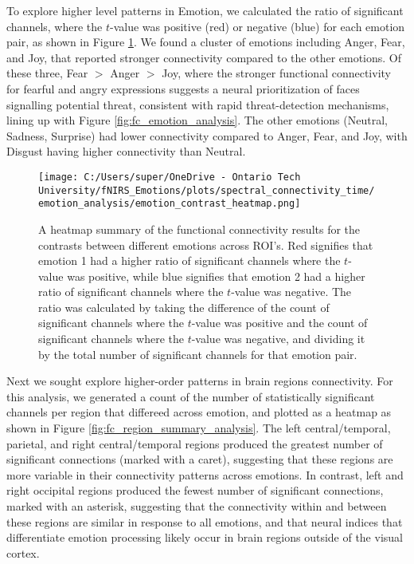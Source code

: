 To explore higher level patterns in Emotion, we calculated the ratio of significant channels, where the $t$-value was positive (red) or negative (blue) for each emotion pair, as shown in Figure \ref{fig:fc_emotion_summary_analysis}.
We found a cluster of emotions including Anger, Fear, and Joy, that reported stronger connectivity compared to the other emotions.
Of these three, Fear $>$ Anger $>$ Joy, where the stronger functional connectivity for fearful and angry expressions suggests a neural prioritization of faces signalling potential threat, consistent with rapid threat-detection mechanisms, lining up with Figure \ref{fig:fc_emotion_analysis}.
The other emotions (Neutral, Sadness, Surprise) had lower connectivity compared to Anger, Fear, and Joy, with Disgust having higher connectivity than Neutral. 

\begin{figure}[H]
  \centering
  \texttt{[image: C:/Users/super/OneDrive - Ontario Tech University/fNIRS\_Emotions/plots/spectral\_connectivity\_time/emotion\_analysis/emotion\_contrast\_heatmap.png]}
  \caption[FC: Summary of Contrasts by Emotion Pair]{A heatmap summary of the functional connectivity results for the contrasts between different emotions across ROI's. 
  Red signifies that emotion 1 had a higher ratio of significant channels where the $t$-value was positive, while blue signifies that emotion 2 had a higher ratio of significant channels where the $t$-value was negative.
  The ratio was calculated by taking the difference of the count of significant channels where the $t$-value was positive and the count of significant channels where the $t$-value was negative, and dividing it by the total number of significant channels for that emotion pair.}
  \label{fig:fc_emotion_summary_analysis}
\end{figure}

Next we sought explore higher-order patterns in brain regions connectivity. 
For this analysis, we generated a count of the number of statistically significant channels per region that differeed across emotion, and plotted as a heatmap as shown in Figure \ref{fig:fc_region_summary_analysis}.
The left central/temporal, parietal, and right central/temporal regions produced the greatest number of significant connections (marked with a caret), suggesting that these regions are more variable in their connectivity patterns across emotions. 
In contrast, left and right occipital regions produced the fewest number of significant connections, marked with an asterisk, suggesting that the connectivity within and between these regions are similar in response to all emotions, and that neural indices that differentiate emotion processing likely occur in brain regions outside of the visual cortex.


